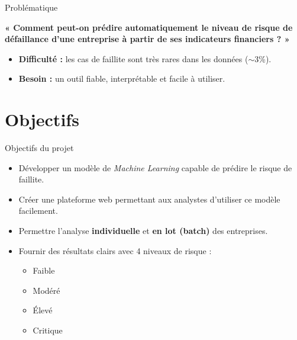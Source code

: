 \documentclass[10pt,aspectratio=169]{beamer}
\begin{document}
\begin{frame}{Problématique}
  \begin{block}{}
    \centering
    \large
    \textbf{« Comment peut-on prédire automatiquement le niveau de
    risque de défaillance d'une entreprise à partir de ses indicateurs
    financiers ? »}
  \end{block}
  \vfill
  \begin{itemize}
    \item \textbf{Difficulté :} les cas de faillite sont très rares dans
          les données ($\sim$3\%).
    \pause
    \item \textbf{Besoin :} un outil fiable, interprétable et facile à
          utiliser.
  \end{itemize}
\end{frame}

\section{Objectifs}

\begin{frame}{Objectifs du projet}
  \begin{itemize}
    \item Développer un modèle de \textit{Machine Learning} capable de
          prédire le risque de faillite.
    \pause
    \item Créer une plateforme web permettant aux analystes d'utiliser ce
          modèle facilement.
    \pause
    \item Permettre l'analyse \textbf{individuelle} et \textbf{en lot
          (batch)} des entreprises.
    \pause
    \item Fournir des résultats clairs avec 4 niveaux de risque :
      \begin{itemize}
        \item[\textcolor{rggreen}{$\blacksquare$}] Faible
        \item[\textcolor{orange}{$\blacksquare$}] Modéré
        \item[\textcolor{red}{$\blacksquare$}] Élevé
        \item[\textcolor{rgred}{$\blacksquare$}] Critique
      \end{itemize}
  \end{itemize}
\end{frame}
\end{document}
